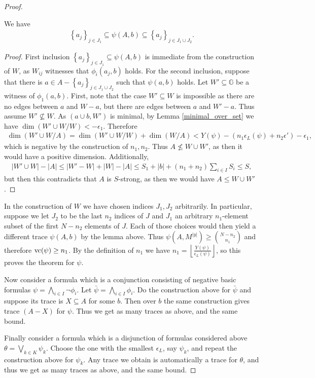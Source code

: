 \documentclass{amsart}
\newcommand{\GG}{\mathbb G}
\newcommand{\curly}[1]{\left\{#1\right\}}
\newcommand{\paren}[1]{\left(#1\right)}
\providecommand{\floor}[1]{\left \lfloor #1 \right \rfloor }
\begin{document}
\begin{proof}
  \begin{Lemma} We have
    \begin{align*}
      \curly{a_j}_{j \in J_1} \subseteq \psi(A, b) \subseteq \curly{a_j}_{j \in J_1 \cup J_2}.
    \end{align*}
  \end{Lemma}
  \begin{proof}
    First inclusion $\curly{a_j}_{j \in J_1} \subseteq \psi(A, b)$ is immediate from the construction of $W$,
    as $W_{ij}$ witnesses that $\phi_i(a_j, b)$ holds.
    For the second inclusion, suppose that there is $a \in A - \curly{a_j}_{j \in J_1 \cup J_2}$ such that $\psi(a,b)$ holds.
    Let $W' \subseteq \GG$ be a witness of $\phi_1(a,b)$.
    First, note that the case $W' \subseteq W$ is impossible
    as there are no edges between $a$ and $W - a$, but there are edges between $a$ and $W' - a$.
    Thus assume $W' \not\subseteq W$.
    As $(a \cup b, W')$ is minimal, by Lemma \ref{minimal_over_set} we have $\dim (W' \cup W / W) < -\epsilon_1$.
    Therefore
    \begin{align*}
      \dim(W' \cup W / A) = \dim (W' \cup W / W) + \dim(W/A) < Y(\psi) - \paren{n_1 \epsilon_L(\psi) + n_2 \epsilon'} - \epsilon_1,
    \end{align*}
    which is negative by the construction of $n_1, n_2$.
    Thus $A \not\leq W \cup W'$, as then it would have a positive dimension.
    Additionally,
    \begin{align*}
      |W' \cup W| - |A| \leq |W' - W| + |W| - |A| \leq S_1 + |b| + (n_1 + n_2) \sum_{i \in I} S_i \leq S,
    \end{align*}
    but then this contradicts that $A$ is $S$-strong, as then we would have $A \leq W \cup W'$.
  \end{proof}

  In the construction of $W$ we have chosen indices $J_1, J_2$ arbitrarily.
  In particular, suppose we let $J_2$ to be the last $n_2$ indices of $J$ and
  $J_1$ an arbitrary $n_1$-element subset of the first $N - n_2$ elements of $J$.
  Each of those choices would then yield a different trace $\psi(A, b)$ by the lemma above.
  Thus $\psi(A, M^{|y|}) \geq {N - n_2 \choose n_1}$ and therefore $\operatorname{vc}(\psi) \geq n_1$.
  By the definition of $n_1$ we have $n_1 = \floor{\frac{Y(\psi)}{\epsilon_L(\psi)}}$, so this proves the theorem for $\psi$.
 
  Now consider a formula which is a conjunction consisting of negative basic formulas $\psi = \bigwedge_{i \in I} \neg \phi_i$.
  Let $\bar \psi = \bigwedge_{i \in I} \phi_i$.
  Do the construction above for $\bar \psi$ and suppose its trace is $X \subseteq A$ for some $b$.
  Then over $b$ the same construction gives trace $(A - X)$ for $\psi$. Thus we get as many traces as above, and the same bound.
  
  Finally consider a formula which is a disjunction of formulas considered above $\theta = \bigvee_{k \in K} \psi_k$.
  Choose the one with the smallest $\epsilon_L$, say $\psi_k$, and repeat the construction above for $\psi_k$.
  Any trace we obtain is automatically a trace for $\theta$, and thus we get as many traces as above, and the same bound.
\end{proof}
\end{document}
